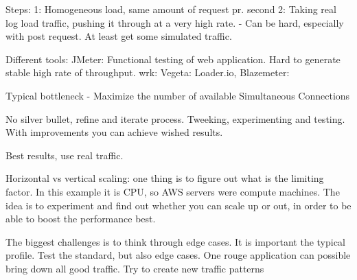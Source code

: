 {Steps:
1: Homogeneous load, same amount of request pr. second
2: Taking real log load traffic, pushing it through at a very high rate. - Can be hard, especially with post request.
	At least get some simulated traffic.
	
Different tools:
JMeter: Functional testing of web application. Hard to generate stable high rate of throughput.
wrk:
Vegeta: 
Loader.io, Blazemeter: 


Typical bottleneck - Maximize the number of available Simultaneous Connections

No silver bullet, refine and iterate process. Tweeking, experimenting and testing. With improvements you can achieve wished results.

Best results, use real traffic. 

Horizontal vs vertical scaling:
one thing is to figure out what is the limiting factor. In this example it is CPU, so AWS servers were compute machines. The idea is to experiment and find out whether you can scale up or out, in order to be able to boost the performance best.

The biggest challenges is to think through edge cases. It is important the typical profile. Test the standard, but also edge cases. One rouge application can possible bring down all good traffic. Try to create new traffic patterns
}